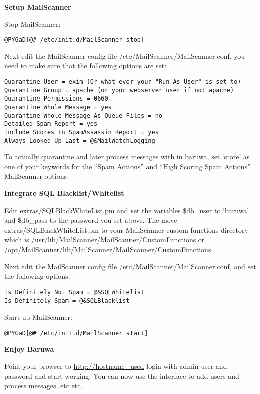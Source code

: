 \documentclass[a4paper,10pt,english]{manual}
\begin{document}
\textbf{Setup MailScanner}

Stop MailScanner:

\begin{Verbatim}[commandchars=@\[\]]
@PYGaD[@# /etc/init.d/MailScanner stop]
\end{Verbatim}

Next edit the MailScanner config file /etc/MailScanner/MailScanner.conf,
you need to make sure that the following options are set:

\begin{Verbatim}[commandchars=@\[\]]
Quarantine User = exim (Or what ever your "Run As User" is set to)
Quarantine Group = apache (or your webserver user if not apache)
Quarantine Permissions = 0660
Quarantine Whole Message = yes
Quarantine Whole Message As Queue Files = no
Detailed Spam Report = yes
Include Scores In SpamAssassin Report = yes
Always Looked Up Last = @&MailWatchLogging
\end{Verbatim}

To actually quarantine and later process messages with in baruwa, set
`store' as one of your keywords for the ``Spam Actions'' and
``High Scoring Spam Actions'' MailScanner options

\textbf{Integrate SQL Blacklist/Whitelist}

Edit extras/SQLBlackWhiteList.pm and set the variables \$db\_user to `baruwa' and
\$db\_pass to the password you set above. The move extras/SQLBlackWhiteList.pm to
your MailScanner custom functions directory which is
/usr/lib/MailScanner/MailScanner/CustomFunctions or
/opt/MailScanner/lib/MailScanner/MailScanner/CustomFunctions

Next edit the MailScanner config file /etc/MailScanner/MailScanner.conf, and
set the following options:

\begin{Verbatim}[commandchars=@\[\]]
Is Definitely Not Spam = @&SQLWhitelist
Is Definitely Spam = @&SQLBlacklist
\end{Verbatim}

Start up MailScanner:

\begin{Verbatim}[commandchars=@\[\]]
@PYGaD[@# /etc/init.d/MailScanner start]
\end{Verbatim}

\textbf{Enjoy Baruwa}

Point your browser to \href{http://hostname\_used}{http://hostname\_used} login with admin user and password
and start working. You can now use the interface to add users and process
messages, etc etc.
\end{document}

